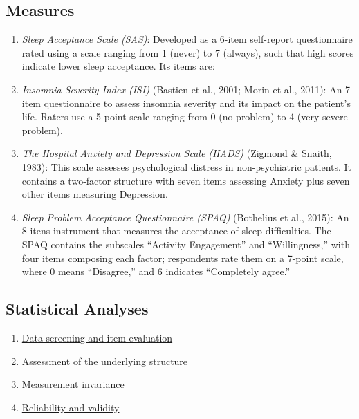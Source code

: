 \documentclass[
  letterpaper,
  DIV=11,
  numbers=noendperiod]{scrreprt}
\providecommand{\tightlist}{%
  \setlength{\itemsep}{0pt}\setlength{\parskip}{0pt}}\usepackage{longtable,booktabs,array}
\begin{document}
\hypertarget{measures}{%
\subsection{Measures}\label{measures}}

\begin{enumerate}
\def\labelenumi{\arabic{enumi}.}
\item
  \emph{Sleep Acceptance Scale (SAS)}: Developed as a 6-item self-report
  questionnaire rated using a scale ranging from 1 (never) to 7
  (always), such that high scores indicate lower sleep acceptance. Its
  items are:
\item
  \emph{Insomnia Severity Index (ISI)} (Bastien et al., 2001; Morin et
  al., 2011): An 7-item questionnaire to assess insomnia severity and
  its impact on the patient's life. Raters use a 5-point scale ranging
  from 0 (no problem) to 4 (very severe problem).
\item
  \emph{The Hospital Anxiety and Depression Scale (HADS)} (Zigmond \&
  Snaith, 1983): This scale assesses psychological distress in
  non-psychiatric patients. It contains a two-factor structure with
  seven items assessing Anxiety plus seven other items measuring
  Depression.
\item
  \emph{Sleep Problem Acceptance Questionnaire (SPAQ)} (Bothelius et
  al., 2015): An 8-itens instrument that measures the acceptance of
  sleep difficulties. The SPAQ contains the subscales ``Activity
  Engagement'' and ``Willingness,'' with four items composing each
  factor; respondents rate them on a 7-point scale, where 0 means
  ``Disagree,'' and 6 indicates ``Completely agree.''
\end{enumerate}

\hypertarget{statistical-analyses}{%
\subsection{Statistical Analyses}\label{statistical-analyses}}

\begin{enumerate}
\def\labelenumi{\arabic{enumi}.}
\tightlist
\item
  \protect\hyperlink{data-screening}{Data screening and item evaluation}
\item
  \protect\hyperlink{dimensionality-analyses}{Assessment of the
  underlying structure}
\item
  \protect\hyperlink{invariance}{Measurement invariance}
\item
  \protect\hyperlink{reliability-and-validity}{Reliability and validity}
\end{enumerate}
\end{document}
